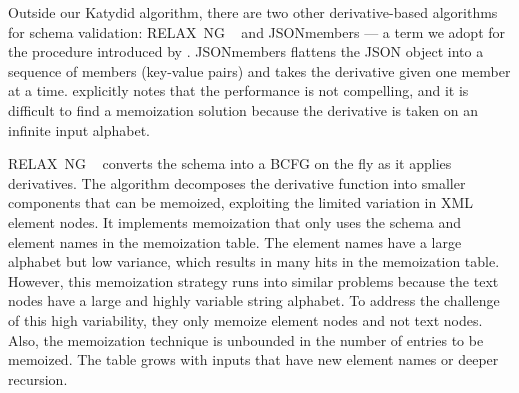 \documentclass[acmsmall,%
  screen,%
  authorversion, %
  nonacm%
]{acmart}
\newcommand{\RelaxNG}{%
  RELAX~NG\xspace%
}
\newcommand{\BCFG}{\ac{BCFG}\xspace}
\newcommand{\JSON}{\ac{JSON}\xspace}
\newcommand{\XML}{\ac{XML}\xspace}
\begin{document}
Outside our Katydid algorithm, there are two other derivative-based algorithms for schema validation: \RelaxNG~\cite{relaxng2001simple} and JSONmembers — a term we adopt for the procedure introduced by \citet{holstege2019application}.
JSONmembers flattens the \JSON object into a sequence of members (key-value pairs) and takes the derivative given one member at a time.
\citet{holstege2019application} explicitly notes that the performance is not compelling, and it is difficult to find a memoization solution because the derivative is taken on an infinite input alphabet.

\RelaxNG~\cite{relaxng2001simple} converts the schema into a \BCFG on the fly as it applies derivatives.
The algorithm decomposes the derivative function into smaller components that can be memoized, exploiting the limited variation in \XML element nodes.
It implements memoization that only uses the schema and element names in the memoization table.
The element names have a large alphabet but low variance, which results in many hits in the memoization table.
However, this memoization strategy runs into similar problems because the text nodes have a large and highly variable string alphabet.
To address the challenge of this high variability, they only memoize element nodes and not text nodes.
Also, the memoization technique is unbounded in the number of entries to be memoized.
The table grows with inputs that have new element names or deeper recursion.
\end{document}
